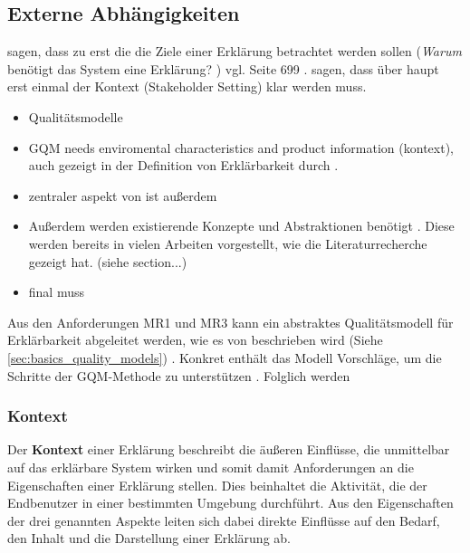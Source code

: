 \subsection{Externe Abhängigkeiten}

\cite{rosenfeld_explainability_2019} sagen, dass zu erst die die Ziele einer Erklärung betrachtet werden sollen (\glqq \textit{Warum} benötigt das System eine Erklärung? \grqq{}) vgl. Seite 699 \cite{rosenfeld_explainability_2019}. \cite{cirqueira_scenario-based_2020} sagen, dass über haupt erst einmal der Kontext (\glqq Stakeholder Setting\grqq{}) klar werden muss.

\begin{itemize}
    \item Qualitätsmodelle \cite{schneider2012abenteuer}
    \item GQM \cite{briand1995goal, schneider2012abenteuer} needs enviromental characteristics and product information (kontext), auch gezeigt in der Definition von Erklärbarkeit durch \cite{chazette_knowledge_nodate}.
    \item zentraler aspekt von \cite{briand1995goal} ist außerdem 
    \item Außerdem werden existierende Konzepte und Abstraktionen benötigt \cite{briand1995goal}. Diese werden bereits in vielen Arbeiten vorgestellt, wie die Literaturrecherche gezeigt hat. (siehe section...)
    \item final muss 
\end{itemize}

Aus den Anforderungen MR1 und MR3 kann ein abstraktes Qualitätsmodell für Erklärbarkeit abgeleitet werden, wie es von \citeauthor{schneider2012abenteuer} beschrieben wird (Siehe \autoref{sec:basics_quality_models}) \cite{schneider2012abenteuer}. Konkret enthält das Modell Vorschläge, um die Schritte der GQM-Methode zu unterstützen \cite{briand1995goal, schneider2012abenteuer}. Folglich werden 

\subsubsection{Kontext}

Der \textbf{Kontext} einer Erklärung beschreibt die äußeren Einflüsse, die unmittelbar auf das erklärbare System wirken und somit damit Anforderungen an die Eigenschaften einer Erklärung stellen. Dies beinhaltet die Aktivität, die der Endbenutzer in einer bestimmten Umgebung durchführt. Aus den Eigenschaften der drei genannten Aspekte leiten sich dabei direkte Einflüsse auf den Bedarf, den Inhalt und die Darstellung einer Erklärung ab.


